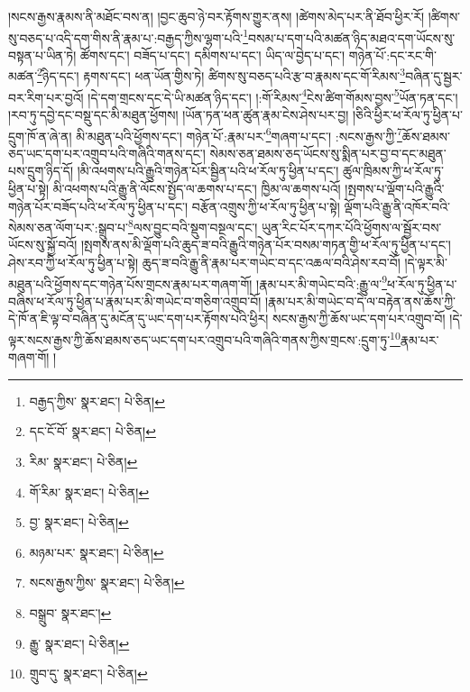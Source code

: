 །སངས་རྒྱས་རྣམས་ནི་མཐོང་བས་ན། །བྱང་ཆུབ་ཉེ་བར་རྟོགས་གྱུར་ནས། །ཚེགས་མེད་པར་ནི་ཐོབ་ཕྱིར་རོ། །ཚིགས་སུ་བཅད་པ་འདི་དག་གིས་ནི་རྣམ་པ་:བརྒྱད་ཀྱིས་ལྷག་པའི་\footnote{བརྒྱད་ཀྱིས་  སྣར་ཐང་།  པེ་ཅིན། }བསམ་པ་དག་པའི་མཚན་ཉིད་མཐའ་དག་ཡོངས་སུ་བསྟན་པ་ཡིན་ཏེ། ཚོགས་དང་། བཟོད་པ་དང་། དམིགས་པ་དང་། ཡིད་ལ་བྱེད་པ་དང་། གཉེན་པོ་:དང་རང་གི་མཚན་\footnote{དང་ངོ་བོ་  སྣར་ཐང་།  པེ་ཅིན། }ཉིད་དང་། རྟགས་དང་། ཕན་ཡོན་གྱིས་ཏེ། ཚིགས་སུ་བཅད་པའི་རྩ་བ་རྣམས་དང་གོ་རིམས་\footnote{རིམ་  སྣར་ཐང་།  པེ་ཅིན། }བཞིན་དུ་སྦྱར་བར་རིག་པར་བྱའོ། །དེ་དག་གྲངས་དང་དེ་ཡི་མཚན་ཉིད་དང་། །:གོ་རིམས་\footnote{གོ་རིམ་  སྣར་ཐང་།  པེ་ཅིན། }ངེས་ཚིག་གོམས་བྱས་\footnote{བྱ་  སྣར་ཐང་།  པེ་ཅིན། }ཡོན་ཏན་དང་། །རབ་ཏུ་དབྱེ་དང་བསྡུ་དང་མི་མཐུན་ཕྱོགས། །ཡོན་ཏན་ཕན་ཚུན་རྣམ་ངེས་ཤེས་པར་བྱ། །ཅིའི་ཕྱིར་ཕ་རོལ་ཏུ་ཕྱིན་པ་དྲུག་ཁོ་ན་ཞེ་ན། མི་མཐུན་པའི་ཕྱོགས་དང་། གཉེན་པོ་:རྣམ་པར་\footnote{མཉམ་པར་  སྣར་ཐང་།  པེ་ཅིན། }གཞག་པ་དང་། :སངས་རྒྱས་ཀྱི་\footnote{སངས་རྒྱས་ཀྱིས་  སྣར་ཐང་།  པེ་ཅིན། }ཆོས་ཐམས་ཅད་ཡང་དག་པར་འགྲུབ་པའི་གཞིའི་གནས་དང་། སེམས་ཅན་ཐམས་ཅད་ཡོངས་སུ་སྨིན་པར་བྱ་བ་དང་མཐུན་པས་དྲུག་ཉིད་དོ། །མི་འཕགས་པའི་རྒྱུའི་གཉེན་པོར་སྦྱིན་པའི་ཕ་རོལ་ཏུ་ཕྱིན་པ་དང་། ཚུལ་ཁྲིམས་ཀྱི་ཕ་རོལ་ཏུ་ཕྱིན་པ་སྟེ། མི་འཕགས་པའི་རྒྱུ་ནི་ལོངས་སྤྱོད་ལ་ཆགས་པ་དང་། ཁྱིམ་ལ་ཆགས་པའོ། །སྤགས་པ་ལྡོག་པའི་རྒྱུའི་གཉེན་པོར་བཟོད་པའི་ཕ་རོལ་ཏུ་ཕྱིན་པ་དང་། བརྩོན་འགྲུས་ཀྱི་ཕ་རོལ་ཏུ་ཕྱིན་པ་སྟེ། ལྡོག་པའི་རྒྱུ་ནི་འཁོར་བའི་སེམས་ཅན་ལོག་པར་:སྒྲུབ་པ་\footnote{བསྒྲུབ་  སྣར་ཐང་། }ལས་བྱུང་བའི་སྡུག་བསྔལ་དང་། ཡུན་རིང་པོར་དཀར་པོའི་ཕྱོགས་ལ་སྦྱོར་བས་ཡོངས་སུ་སྐྱོ་བའོ། །སྤགས་ནས་མི་ལྡོག་པའི་ཆུད་ཟ་བའི་རྒྱུའི་གཉེན་པོར་བསམ་གཏན་གྱི་ཕ་རོལ་ཏུ་ཕྱིན་པ་དང་། ཤེས་རབ་ཀྱི་ཕ་རོལ་ཏུ་ཕྱིན་པ་སྟེ། ཆུད་ཟ་བའི་རྒྱུ་ནི་རྣམ་པར་གཡེང་བ་དང་འཆལ་བའི་ཤེས་རབ་བོ། །དེ་ལྟར་མི་མཐུན་པའི་ཕྱོགས་དང་གཉེན་པོས་གྲངས་རྣམ་པར་གཞག་གོ། །རྣམ་པར་མི་གཡེང་བའི་:རྒྱུ་ལ་\footnote{རྒྱུ་  སྣར་ཐང་།  པེ་ཅིན། }ཕ་རོལ་ཏུ་ཕྱིན་པ་བཞིས་ཕ་རོལ་ཏུ་ཕྱིན་པ་རྣམ་པར་མི་གཡེང་བ་གཅིག་འགྲུབ་བོ། །རྣམ་པར་མི་གཡེང་བ་དེ་ལ་བརྟེན་ནས་ཆོས་ཀྱི་དེ་ཁོ་ན་ཇི་ལྟ་བ་བཞིན་དུ་མངོན་དུ་ཡང་དག་པར་རྟོགས་པའི་ཕྱིར། སངས་རྒྱས་ཀྱི་ཆོས་ཡང་དག་པར་འགྲུབ་བོ། །དེ་ལྟར་སངས་རྒྱས་ཀྱི་ཆོས་ཐམས་ཅད་ཡང་དག་པར་འགྲུབ་པའི་གཞིའི་གནས་ཀྱིས་གྲངས་:དྲུག་ཏུ་\footnote{གྲུབ་དུ་  སྣར་ཐང་།  པེ་ཅིན། }རྣམ་པར་གཞག་གོ། །
